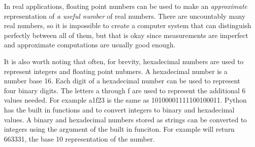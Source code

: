 In real applications, floating point numbers can be used to make an \textit{approximate} representation of \textit{a useful number} of real numbers.
There are uncountably many real numbers, so it is impossible to create a computer system that can distinguish perfectly between all of them, but that is okay since measurements are imperfect and approximate computations are usually good enough.

It is also worth noting that often, for brevity, hexadecimal numbers are used to represent integers and floating point nubmers.
A hexadecimal number is a number base 16.
Each digit of a hexadecimal number can be used to represent four binary digits.
The letters a through f are used to represent the additional 6 values needed.
For example a1f23 is the same as 10100001111100100011.
Python has the built in functions  and  to convert integers to binary and hexadecimal values.
A binary and hexadecimal numbers stored as strings can be converted to integers using the  argument of the built in  funciton.
For example  will return 663331, the base 10 representation of the number.

